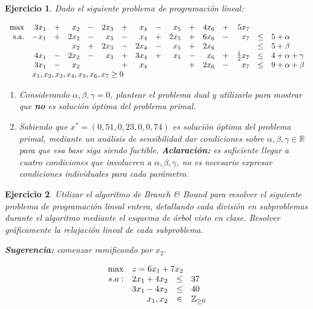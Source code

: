 \documentclass[a4paper,oneside,12pt]{amsart}
\newtheorem{quest}{Ejercicio}
\begin{document}


\begin{quest}
Dado el siguiente problema de programación lineal:

\[\begin{array}{rrrrrrrrrrrrrrrl}
    \max & 3x_1 & + & x_2 & - & 2x_3 & + & x_4 & - & x_5 & + & 4x_6 & + & 5x_7 & &\\
    \text{s.a.} & -x_1 & + & 2x_2 & - & x_3 & - & x_4 & + & 2x_5 & + & 6x_6 & - & x_7 & \leq & 5 + \alpha\\
    &  &  & x_2 & + & 2x_3 & - & 2x_4 & - & x_5 & + & 2x_6 & & &\leq & 5 + \beta \\
    & 4x_1 & - & 2x_2 & - & x_3 & + & 3x_4 & + & x_5 & - & x_6 & + &\frac{1}{2}x_7 & \leq & 4 +\alpha + \gamma\\
    & 3x_1 & - & x_2  &  &  & + & x_4 &  &  & + & 2x_6 & -&x_7 &\leq & 9 + \alpha + \beta \\
    & \multicolumn{15}{l}{x_1,x_2,x_3,x_4,x_5,x_6,x_7\geq 0}
\end{array}
\]

\begin{enumerate}[label=\alph*)]
    \item Considerando $\alpha,\beta,\gamma=0$, plantear el problema dual y utilizarlo para mostrar que  \textbf{no} es solución óptima del problema primal.
    \item Sabiendo que $x^\ast = (0,51,0,23,0,0,74)$ es solución óptima del problema primal, mediante un análisis de sensibilidad dar condiciones sobre $\alpha,\beta, \gamma\in \mathbb{R}$ para que esa base siga siendo factible.
    \textbf{Aclaración:} es suficiente llegar a cuatro condiciones que involucren a $\alpha,\beta,\gamma$, no es necesario expresar condiciones individuales para cada parámetro.
\end{enumerate}
\end{quest}




\begin{quest} 
Utilizar el algoritmo de Branch \& Bound para resolver el siguiente problema de programaci\'on lineal entera, detallando cada divisi\'on en subproblemas durante el algoritmo mediante el esquema de \'arbol visto en clase. Resolver gráficamente la relajación lineal de cada subproblema.

\textbf{Sugerencia:} comenzar ramificando por $x_2$.

\[
\begin{array}{rrcl}
\max & \multicolumn{3}{l}{z = 6x_1+7x_2} \\
s.a: & 2x_1+4x_2 & \leq & 37 \\
 & 3x_1-4x_2 & \leq & 40 \\
 & x_1, x_2 & \in & \mathbb{Z}_{\geq 0}
\end{array}
\]



\end{quest}

\end{document}

